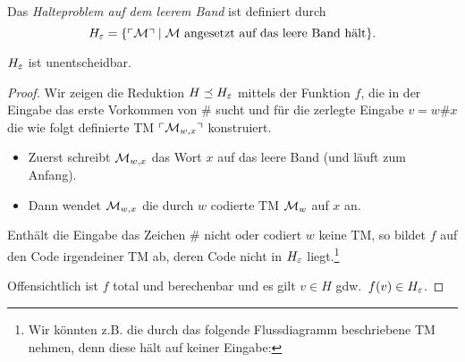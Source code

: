 \begin{Def}[name={[Halteproblem auf leerem Band $H_\Eps$]}]
	Das \emph{Halteproblem auf dem leerem Band} ist definiert durch
	\[H_\varepsilon = \{\ulcorner \mathcal{M} \urcorner \mid \mathcal{M} \text{ angesetzt auf das leere Band hält}\}. \qedhere\]
\end{Def}
\begin{Satz}[name={[$H_\Eps$ ist unentscheidbar]}]
\label{satz:HalteproblemLeeresBand}
	$H_\Eps$ ist unentscheidbar.
\end{Satz}
\begin{proof}
  Wir zeigen die Reduktion $H \preceq H_\varepsilon$ mittels der Funktion $f$, 
  die in der Eingabe das erste Vorkommen von $\#$ sucht und
  für die zerlegte Eingabe $v = w\#x$ die wie folgt definierte \ac{TM} $\ulcorner \mathcal{M}_{w,x} \urcorner$ konstruiert.
  \begin{itemize}
  \item Zuerst schreibt $\mathcal{M}_{w,x}$ das Wort $x$ auf das leere Band (und läuft zum Anfang).
  \item Dann wendet $\mathcal{M}_{w,x}$ die durch $w$ codierte \ac{TM} $\mathcal{M}_w$ auf $x$ an.
  \end{itemize}
  Enthält die Eingabe das Zeichen $\#$ nicht oder codiert $w$ keine \ac{TM},
  so bildet $f$ auf den Code irgendeiner TM ab,
  deren Code nicht in $H_\Eps$ liegt.\footnote{
  Wir könnten z.B. die durch das folgende Flussdiagramm beschriebene TM nehmen, denn diese hält auf keiner Eingabe:
  }
  
  Offensichtlich ist $f$ total und berechenbar und es gilt $v\in H$ gdw.\ $f(v) \in H_\varepsilon$.
\end{proof}


